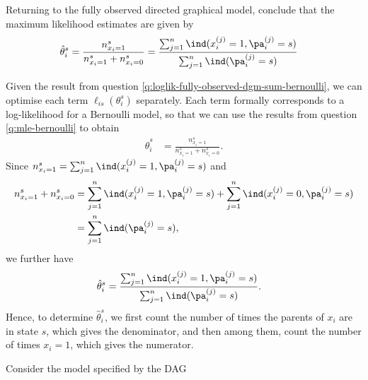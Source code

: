 \begin{exenumerate}
\item Returning to the fully observed directed graphical model, conclude that the maximum likelihood estimates are given by
  \begin{align}
    \hat{\theta}_i^s &= \frac{n_{x_i=1}^s}{n_{x_i=1}^s+n_{x_i=0}^s} = \frac{ \sum_{j=1}^n\ind(x_i^{(j)}=1, \pa_i^{(j)}=s) }{ \sum_{j=1}^n\ind(\pa_i^{(j)}=s) }
  \end{align}
  
  \begin{solution}
    Given the result from question
    \ref{q:loglik-fully-observed-dgm-sum-bernoulli}, we can optimise
    each term $\ell_{is}(\theta_i^s)$ separately. Each term formally
    corresponds to a log-likelihood for a Bernoulli model, so that we
    can use the results from question \ref{q:mle-bernoulli} to obtain
    \begin{align}
      \hat{\theta}_i^s &= \frac{n_{x_i=1}^s}{n_{x_i=1}^s+n_{x_i=0}^s}.
    \end{align}
    Since $n_{x_i=1}^s = \sum_{j=1}^n\ind(x_i^{(j)}=1, \pa_i^{(j)}=s)$ and
    \begin{align}
      n_{x_i=1}^s+n_{x_i=0}^s &=  \sum_{j=1}^n\ind(x_i^{(j)}=1, \pa_i^{(j)}=s) +  \sum_{j=1}^n\ind(x_i^{(j)}=0, \pa_i^{(j)}=s)\\
      & =  \sum_{j=1}^n\ind( \pa_i^{(j)}=s),
    \end{align}
    we further have
    \begin{align}
      \hat{\theta}_i^s &= \frac{ \sum_{j=1}^n\ind(x_i^{(j)}=1, \pa_i^{(j)}=s) }{ \sum_{j=1}^n\ind(\pa_i^{(j)}=s) }.
      \label{eq:dag-table-mle}
    \end{align}
    Hence, to determine $\hat{\theta}_i^s$, we first count the
    number of times the parents of $x_i$ are in state $s$, which
    gives the denominator, and then among them, count the number of
    times $x_i=1$, which gives the numerator.
    
  \end{solution}
  
\end{exenumerate}


\label{ex:cancer-smoking-asbestos-mle} 
Consider the model specified by the DAG

\begin{center}
\end{center}

